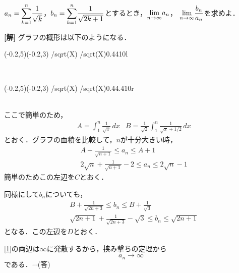\documentclass[a4j]{jarticle}
\begin{document}

     \begin{oframed}
     $a_n={\displaystyle\sum_{k=1}^{n}}\dfrac{1}{\sqrt{k}}$，$b_n={\displaystyle\sum_{k=1}^{n}}\dfrac{1}{\sqrt{2k+1}}$とするとき，${\displaystyle \lim_{n\to\infty}}a_n$，
     ${\displaystyle \lim_{n\to\infty}}\dfrac{b_n}{a_n}$を求めよ．
     \end{oframed}

\setlength{\columnseprule}{0.4pt}
\begin{multicols}{2}
{\bf[解]} 
グラフの概形は以下のようになる．

     \begin{zahyou}[ul=8mm](-0.2,5)(-0.2,3) 
     \def\Fx{1/sqrt(X)}
     \YGurafu*[hidarix=0]\Fx
     \kubunkyuusekizu\Fx{0.4}{4}{10}{l}
     \Put{}
     \Put{}
     \end{zahyou}\\

     \begin{zahyou}[ul=8mm](-0.2,5)(-0.2,3) 
     \def\Fx{1/sqrt(X)}
     \YGurafu*[hidarix=0]\Fx
     \kubunkyuusekizu\Fx{0.4}{4.4}{10}{r}
     \Put{}
     \Put{}
     \end{zahyou}\\

ここで簡単のため，
     \begin{align*}
     &A= \int_1^n\frac{1}{\sqrt{x}}\,dx&B= \frac{1}{\sqrt{2}}\int_1^n\frac{1}{\sqrt{x}+1/2}\,dx
     \end{align*}
とおく．グラフの面積を比較して，$n$が十分大きい時，
     \begin{align}
     &A+\frac{1}{\sqrt{n+1}}\le a_n\le A+1\nonumber \\
     &2\sqrt{n}+\frac{1}{\sqrt{n+1}}-2\le a_n\le 2\sqrt{n}-1\label{1}
     \end{align}
簡単のためこの左辺を$C$とおく．

同様にして$b_n$についても，
     \begin{align}
     &B+\frac{1}{\sqrt{2n+3}}\le b_n\le B+\frac{1}{\sqrt{3}}\nonumber \\
     &\sqrt{2n+1}+\frac{1}{\sqrt{2n+3}}-\sqrt{3}\le b_n\le \sqrt{2n+1}\label{2}
     \end{align}
となる．この左辺を$D$とおく．

\eqref{1}の両辺は$\infty$に発散するから，挟み撃ちの定理から
     \[a_n\to\infty\]
である．$\cdots$(答)


\end{multicols}
\end{document}
